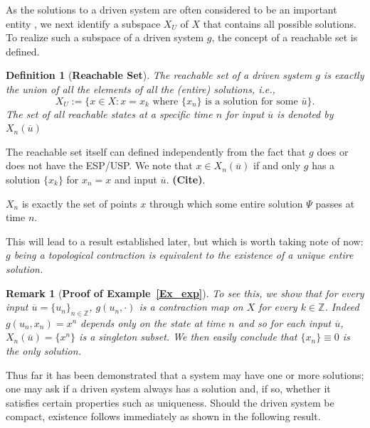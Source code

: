\documentclass[a4paper,12pt,twoside]{report}
\newtheorem{Definition}{Definition}[]
\newtheorem{Remark}{Remark}[]
\begin{document}
As the solutions to a driven system are often considered to be an important entity \cite{M: edited the sentence here}, we next identify a subspace $X_U$ of $X$ that contains all possible solutions. To realize such a subspace of a driven system $g$, the concept of a reachable set is defined.

\begin{Definition}
  [\bf Reachable Set]\label{Dfn_ReachableSet}\rm
The reachable set of a driven system $g$ is exactly the union of all the elements of all the (entire) solutions, i.e., 
\[X_U :=\Big \{x \in X:  x = x_k \mbox{ where  $\{x_n\}$  is a solution for some  $\bar{u}$} \Big \}.\]
The set of all reachable states at a specific time $n$ for input $\overline{u}$ is denoted by $X_n(\overline{u})$
\end{Definition}

The reachable set itself can defined independently from the fact that $g$ does or does not have the ESP/USP. We note that $x\in{X_n(\overline{u})}$ if and only $g$ has a solution $\{x_k\}$ for $x_n=x$ and input $\overline{u}$. \textbf{(Cite)}.

$X_n$ is exactly the set of points $x$ through which some entire solution $\Psi$ passes at time $n$.

This will lead to a result established later, but which is worth taking note of now: \textit{$g$ being a topological contraction is equivalent to the existence of a unique entire solution.}


\begin{Remark}
  [\bf Proof of Example~\ref{Ex_exp}] \label{rem_proofEx} \rm
  To see this, we show that for every input $\overline{u}=\{u_n\}_{n\in\mathbb{Z}}$, $g(u_n,\cdot)$ is a contraction map on $X$ for every $k\in\mathbb{Z}$. 
  Indeed $g(u_n,x_n)=x^n$ depends only on the state at time $n$ and so for each input $\overline{u}$, $X_n(\overline{u})=\{x^n\}$ is a singleton subset.
  We then easily conclude that $\{x_n\}\equiv0$ is the only solution. 
\end{Remark} 

Thus far it has been demonstrated that a system may have one or more solutions; one may ask if a driven system always has a solution and, if so, whether it satisfies certain properties such as uniqueness. 
Should the driven system be compact, existence follows immediately as shown in the following result.
\end{document}
